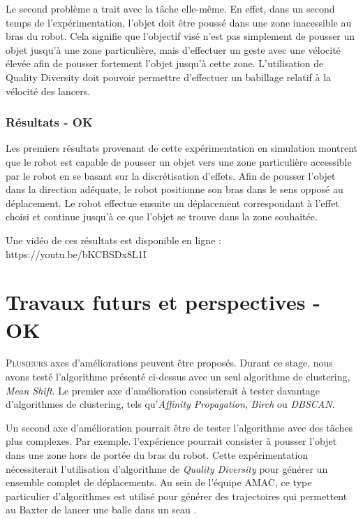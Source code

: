 \documentclass[draft]{llncs}
\begin{document}
Le second problème a trait avec la tâche elle-même.
En effet, dans un second temps de l'expérimentation, l'objet doit être poussé dans une zone inacessible au bras du robot.
Cela signifie que l'objectif visé n'est pas simplement de pousser  un objet jusqu'à une zone particulière, mais d'effectuer un geste avec une vélocité élevée afin de pousser fortement l'objet jusqu'à cette zone.
L'utilisation de Quality Diversity doit pouvoir permettre d'effectuer un babillage relatif à la vélocité des lancers.





\subsubsection{Résultats - OK}

Les premiers résultats provenant de cette expérimentation en simulation montrent que le robot est capable de pousser un objet vers une zone particulière accessible par le robot en se basant sur la discrétisation d'effets.
Afin de pousser l'objet dans la direction adéquate, le robot positionne son bras dans le sens opposé au déplacement.
Le robot effectue ensuite un déplacement correspondant à l'effet choisi et continue jusqu'à ce que l'objet se trouve dans la zone souhaitée.

Une vidéo de ces résultats est disponible en ligne : https://youtu.be/bKCBSDx8L1I





\section{Travaux futurs et perspectives - OK}

\lettrine{P}{lusieurs} axes d'améliorations peuvent être proposés.
Durant ce stage, nous avons testé l'algorithme présenté ci-dessus avec un seul algorithme de clustering, \textit{Mean Shift}.
Le premier axe d'amélioration consisterait à tester davantage d'algorithmes de clustering, tels qu'\textit{Affinity Propagation}, \textit{Birch} ou \textit{DBSCAN}.

Un second axe d'amélioration pourrait être de tester l'algorithme avec des tâches plus complexes.
Par exemple. l'expérience pourrait consister à pousser l'objet dans une zone hors de portée du bras du robot.
Cette expérimentation nécessiterait l'utilisation d'algorithme de \textit{Quality Diversity} \cite{Pugh2016} pour générer un ensemble complet de déplacements.
Au sein de l'équipe AMAC, ce type particulier d'algorithmes est utilisé pour générer des trajectoires qui permettent au Baxter de lancer une balle dans un seau \cite{Kim2017}. 
\end{document}
